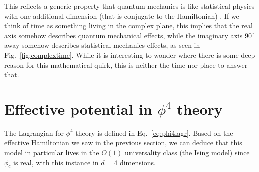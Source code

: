 \documentclass[%
 reprint,
nofootinbib,
 amsmath,amssymb,
 aps,
floatfix,
]{revtex4-1}
\begin{document}
This reflects a generic property that quantum mechanics is like statistical physics with one additional dimension (that is conjugate to the Hamiltonian) \cite{radzihovsky17}.
If we think of time as something living in the complex plane, this implies that the real axis somehow describes quantum mechanical effects, while the imaginary axis $90^{\circ}$ away somehow describes statistical mechanics effects, as seen in Fig.~\ref{fig:complextime}.
While it is interesting to wonder where there is some deep reason for this mathematical quirk, this is neither the time nor place to answer that.

\section{\label{sec:phi4theory}Effective potential in $\phi^4$ theory}
The Lagrangian for $\phi^4$ theory is defined in Eq.~\ref{eq:phi4lagr}.
Based on the effective Hamiltonian we saw in the previous section, we can deduce that this model in particular lives in the $O(1)$ universality class (the Ising model) since $\phi_c$ is real, with this instance in $d=4$ dimensions.
\end{document}

